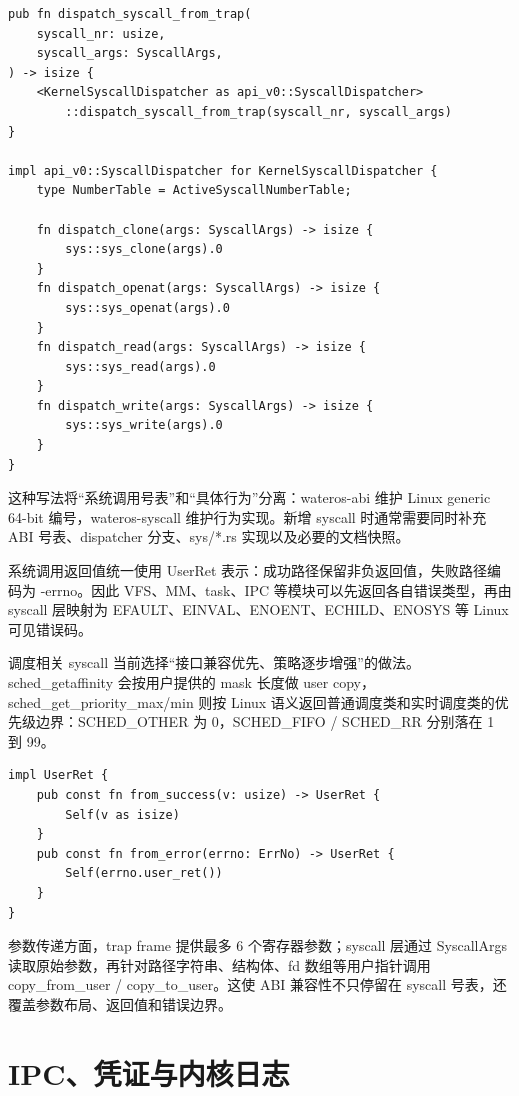 \documentclass[12pt,openany,oneside,AutoFakeBold=true]{ctexbook}
\newcommand{\code}[1]{\textnormal{\rmfamily #1}}
\newcommand{\syscall}[1]{\textnormal{\rmfamily #1}}
\begin{document}
\begin{lstlisting}
pub fn dispatch_syscall_from_trap(
    syscall_nr: usize,
    syscall_args: SyscallArgs,
) -> isize {
    <KernelSyscallDispatcher as api_v0::SyscallDispatcher>
        ::dispatch_syscall_from_trap(syscall_nr, syscall_args)
}

impl api_v0::SyscallDispatcher for KernelSyscallDispatcher {
    type NumberTable = ActiveSyscallNumberTable;

    fn dispatch_clone(args: SyscallArgs) -> isize {
        sys::sys_clone(args).0
    }
    fn dispatch_openat(args: SyscallArgs) -> isize {
        sys::sys_openat(args).0
    }
    fn dispatch_read(args: SyscallArgs) -> isize {
        sys::sys_read(args).0
    }
    fn dispatch_write(args: SyscallArgs) -> isize {
        sys::sys_write(args).0
    }
}
\end{lstlisting}

这种写法将“系统调用号表”和“具体行为”分离：\code{wateros-abi} 维护 Linux generic 64-bit 编号，\code{wateros-syscall} 维护行为实现。新增 syscall 时通常需要同时补充 ABI 号表、dispatcher 分支、\code{sys/*.rs} 实现以及必要的文档快照。


系统调用返回值统一使用 \code{UserRet} 表示：成功路径保留非负返回值，失败路径编码为 \code{-errno}。因此 VFS、MM、task、IPC 等模块可以先返回各自错误类型，再由 syscall 层映射为 \code{EFAULT}、\code{EINVAL}、\code{ENOENT}、\code{ECHILD}、\code{ENOSYS} 等 Linux 可见错误码。

调度相关 syscall 当前选择“接口兼容优先、策略逐步增强”的做法。\syscall{sched\_getaffinity} 会按用户提供的 mask 长度做 user copy，\syscall{sched\_get\_priority\_max/min} 则按 Linux 语义返回普通调度类和实时调度类的优先级边界：\code{SCHED\_OTHER} 为 0，\code{SCHED\_FIFO} / \code{SCHED\_RR} 分别落在 1 到 99。

\begin{lstlisting}
impl UserRet {
    pub const fn from_success(v: usize) -> UserRet {
        Self(v as isize)
    }
    pub const fn from_error(errno: ErrNo) -> UserRet {
        Self(errno.user_ret())
    }
}
\end{lstlisting}

参数传递方面，trap frame 提供最多 6 个寄存器参数；syscall 层通过 \code{SyscallArgs} 读取原始参数，再针对路径字符串、结构体、fd 数组等用户指针调用 \code{copy\_from\_user} / \code{copy\_to\_user}。这使 ABI 兼容性不只停留在 syscall 号表，还覆盖参数布局、返回值和错误边界。

\section{IPC、凭证与内核日志}
\end{document}
